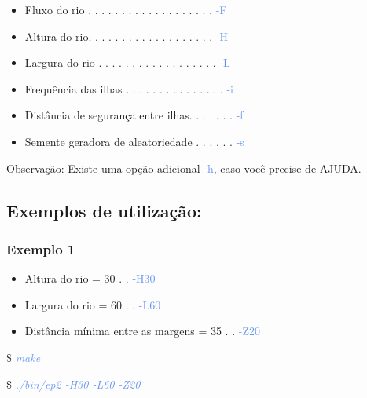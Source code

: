 \documentclass[a4paper,12pt]{article}
\begin{document}
  \bigskip
  \begin{itemize}
  
  \item Fluxo do rio . . . . . . . . . . . . . . . . . . .  \textcolor{CornflowerBlue}{-F}
  \item Altura do rio. . . . . . . . . . . . . . . . . . .  \textcolor{CornflowerBlue}{-H}
  \item Largura do rio . . . . . . . . . . . . . . . . . .  \textcolor{CornflowerBlue}{-L}
  \item Frequência das ilhas . . . . . . . . . . . . . . .  \textcolor{CornflowerBlue}{-i} 
  \item Distância de segurança entre ilhas. . . . . . .  \textcolor{CornflowerBlue}{-f}
  \item Semente geradora de aleatoriedade . . . . . .  \textcolor{CornflowerBlue}{-s}
  
  \end{itemize}
  \bigskip
  
  Observação: Existe uma opção adicional \textcolor{CornflowerBlue}{-h}, caso você precise de AJUDA.
  
  \newpage %
  \subsection{\textcolor{NavyBlue}{Exemplos de utilização:}}
  \bigskip
  
    \subsubsection{\textcolor{NavyBlue}{Exemplo 1}}
    \bigskip
    \begin{itemize}
  
    \item Altura do rio = 30  . . \textcolor{CornflowerBlue}{-H30}
    \item Largura do rio = 60  . . \textcolor{CornflowerBlue}{-L60}  
    \item Distância mínima entre as margens = 35  . . \textcolor{CornflowerBlue}{-Z20}
    
    \end{itemize}  
    \bigskip
    
    \$ \textcolor{CornflowerBlue}{\textit{make}}
    
    \$ \textcolor{CornflowerBlue}{\textit{./bin/ep2 -H30 -L60 -Z20}}
  
\end{document}

